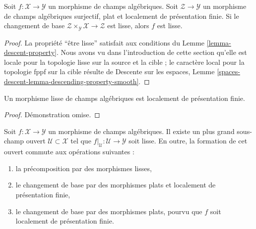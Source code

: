 \begin{lemma}
\label{lemma-descent-smooth}
Soit $f : \mathcal{X} \to \mathcal{Y}$ un morphisme de champs algébriques.
Soit $\mathcal{Z} \to \mathcal{Y}$ un morphisme de champs algébriques surjectif,
plat et localement de présentation finie. Si le changement de base
$\mathcal{Z} \times_\mathcal{Y} \mathcal{X} \to \mathcal{Z}$
est lisse, alors $f$ est lisse.
\end{lemma}

\begin{proof}
La propriété ``être lisse''
satisfait aux conditions du Lemme \ref{lemma-descent-property}.
Nous avons vu dans l'introduction de cette section qu'elle est locale pour la
topologie lisse sur la source et la cible ; le caractère local pour la topologie fppf sur la cible résulte de
Descente sur les espaces, Lemme
\ref{spaces-descent-lemma-descending-property-smooth}.
\end{proof}

\begin{lemma}
\label{lemma-smooth-locally-finite-presentation}
Un morphisme lisse de champs algébriques est localement de présentation finie.
\end{lemma}

\begin{proof}
Démonstration omise.
\end{proof}

\begin{lemma}
\label{lemma-where-smooth}
Soit $f : \mathcal{X} \to \mathcal{Y}$ un morphisme de champs algébriques.
Il existe un plus grand sous-champ ouvert $\mathcal{U} \subset \mathcal{X}$
tel que $f|_\mathcal{U} : \mathcal{U} \to \mathcal{Y}$ soit lisse.
En outre, la formation de cet ouvert commute aux opérations suivantes :
\begin{enumerate}
\item la précomposition par des morphismes lisses,
\item le changement de base par des morphismes plats et localement de
présentation finie,
\item le changement de base par des morphismes plats, pourvu que $f$ soit localement de
présentation finie.
\end{enumerate}
\end{lemma}

